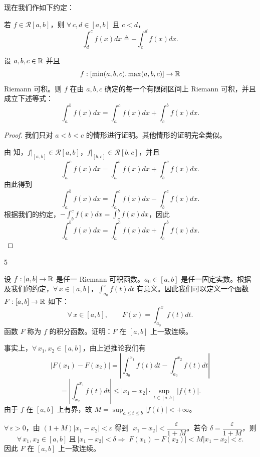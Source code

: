 现在我们作如下约定：

若 \(f\in\mathscr{R}[a,b]\)，则 \(\forall\,c,d\in[a,b]\) 且 \(c<d\)，
\[
\int_d^c f(x)dx\triangleq-\int_c^d f(x)dx.
\]

\begin{mycor*}{}

	设 \(a,b,c\in\mathbb{R}\) 并且
	\[
	f:[\min(a,b,c),\max(a,b,c)]\to\mathbb{R}
	\]
	Riemann 可积。则 \(f\) 在由 \(a,b,c\) 确定的每一个有限闭区间上 Riemann 可积，并且成立下述等式：
	\[
	\int_a^b f(x)dx=\int_a^c f(x)dx+\int_c^b f(x)dx.
	\]

\end{mycor*}

\begin{proof}

	我们只对 \(a<b<c\) 的情形进行证明。其他情形的证明完全类似。

	由 知，\(f|_{[a,b]}\in\mathscr{R}[a,b]\)，\(f|_{[b,c]}\in\mathscr{R}[b,c]\)，并且
	\[
	\int_a^c f(x)dx=\int_a^b f(x)dx+\int_b^c f(x)dx.
	\]
	由此得到
	\[
	\int_a^b f(x)dx=\int_a^c f(x)dx-\int_b^c f(x)dx.
	\]
	根据我们的约定，\(-\int_b^c f(x)dx=\int_c^b f(x)dx\)，因此
	\[
	\int_a^b f(x)dx=\int_a^c f(x)dx+\int_c^b f(x)dx.
	\]

\end{proof}

\begin{sourceexample}{5}

	设 \(f:[a,b]\to\mathbb{R}\) 是任一 Riemann 可积函数。\(a_0\in[a,b]\) 是任一固定实数。根据 及我们的约定，\(\forall\,x\in[a,b]\)，\(\int_{a_0}^x f(t)dt\) 有意义。因此我们可以定义一个函数 \(F:[a,b]\to\mathbb{R}\) 如下：
	\[
	\forall\,x\in[a,b],\qquad F(x)=\int_{a_0}^x f(t)dt.
	\]
	函数 \(F\) 称为 \(f\) 的积分函数。证明：\(F\) 在 \([a,b]\) 上一致连续。

	事实上，\(\forall\,x_1,x_2\in[a,b]\)，由上述推论我们有
	\[
	|F(x_1)-F(x_2)|=\left|\int_{a_0}^{x_1}f(t)dt-\int_{a_0}^{x_2}f(t)dt\right|
	\]
	\[
	=\left|\int_{x_2}^{x_1}f(t)dt\right|\le|x_1-x_2|\cdot\sup_{t\in[a,b]}|f(t)|.
	\]
	由于 \(f\) 在 \([a,b]\) 上有界，故 \(M=\sup_{a\le t\le b}|f(t)|<+\infty\)。

	\(\forall\,\varepsilon>0\)，由 \((1+M)|x_1-x_2|<\varepsilon\) 得到 \(|x_1-x_2|<\dfrac{\varepsilon}{1+M}\)。若令 \(\delta=\dfrac{\varepsilon}{1+M}\)，则
	\[
	\forall\,x_1,x_2\in[a,b]\ \text{且}\ |x_1-x_2|<\delta\Longrightarrow|F(x_1)-F(x_2)|<M|x_1-x_2|<\varepsilon.
	\]
	因此 \(F\) 在 \([a,b]\) 上一致连续。

\end{sourceexample}


